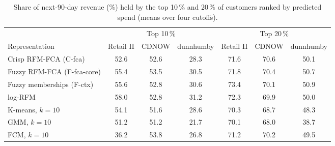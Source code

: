 \begin{table}[t]
\centering\small
\caption{Share of next-90-day revenue (\%) held by the top 10\,\% and 20\,\% of customers ranked by predicted spend (means over four cutoffs).}
\label{tab:targeting}
\begin{tabular}{lcccccc}
\toprule
 & \multicolumn{3}{c}{Top 10\,\%} & \multicolumn{3}{c}{Top 20\,\%} \\
\cmidrule(lr){2-4}\cmidrule(lr){5-7}
Representation & Retail II & CDNOW & dunnhumby & Retail II & CDNOW & dunnhumby \\
\midrule
Crisp RFM-FCA (C-fca) & 52.6 & 52.6 & 28.3 & 71.6 & 70.6 & 50.1 \\
Fuzzy RFM-FCA (F-fca-core) & 55.4 & 53.5 & 30.5 & 71.8 & 70.4 & 50.7 \\
Fuzzy memberships (F-ctx) & 55.6 & 52.8 & 30.6 & 73.4 & 70.1 & 50.9 \\
log-RFM & 58.0 & 52.8 & 31.2 & 72.3 & 69.9 & 50.0 \\
K-means, $k{=}10$ & 54.1 & 51.6 & 28.6 & 70.3 & 68.7 & 48.3 \\
GMM, $k{=}10$ & 51.2 & 51.2 & 21.7 & 70.1 & 68.0 & 38.7 \\
FCM, $k{=}10$ & 36.2 & 53.8 & 26.8 & 71.2 & 70.2 & 49.5 \\
\bottomrule
\end{tabular}
\end{table}
